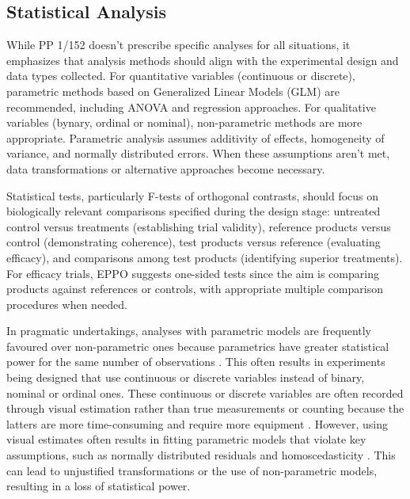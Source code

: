 \documentclass[12pt,a4paper,oneside]{report}
\begin{document}
\subsection{Statistical Analysis}

While PP 1/152 \cite{EPPO_PP1_152} doesn't prescribe 
specific analyses for all situations, it emphasizes that analysis methods should 
align with the experimental design and data types collected. For quantitative 
variables (continuous or discrete), parametric methods based on Generalized 
Linear Models (GLM) are recommended, including ANOVA and regression approaches. 
For qualitative variables (bynary, ordinal or nominal), non-parametric methods are more 
appropriate. Parametric analysis assumes additivity of effects, homogeneity of variance, 
and normally distributed errors. When these assumptions aren't met, data transformations 
or alternative approaches become necessary.

Statistical tests, particularly F-tests of orthogonal 
contrasts, should focus on biologically relevant comparisons specified during the 
design stage: untreated control versus treatments (establishing trial validity), 
reference products versus control (demonstrating coherence), test products versus 
reference (evaluating efficacy), and comparisons among test products (identifying 
superior treatments). For efficacy trials, EPPO suggests one-sided tests since the 
aim is comparing products against references or controls, with appropriate multiple 
comparison procedures when needed.

In pragmatic undertakings, analyses with parametric models are frequently 
favoured over non-parametric ones because parametrics have greater statistical 
power for the same number of 
observations \cite{agresti_exact_2001}.
This often results in experiments being designed that use continuous or discrete 
variables instead of binary, nominal or ordinal ones. These continuous or 
discrete variables are often recorded through visual estimation rather than 
true measurements or counting because the latters are more time-consuming and require more 
equipment \cite{bockPhytopathometryGlossaryTwentyfirst2022,chiang_quantitative_2020,
moraes_characterizing_2022}. However, using visual estimates often results in 
fitting parametric models that violate key assumptions, such as normally 
distributed residuals and homoscedasticity 
\cite{stevenson_overview_2001,acutis_perfunctory_2012,chiang_what_2014}.
This can lead to unjustified transformations or the use of non-parametric models, resulting in a loss of statistical power.
\end{document}
